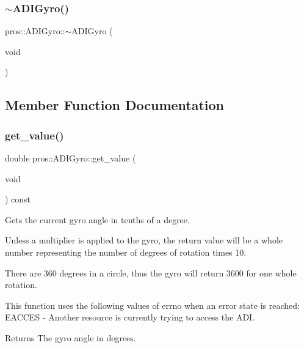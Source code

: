 \subsubsection{\texorpdfstring{$\sim$ADIGyro()}{~ADIGyro()}}
{\footnotesize\ttfamily pros\+::\+A\+D\+I\+Gyro\+::$\sim$\+A\+D\+I\+Gyro (\begin{DoxyParamCaption}\item[{void}]{ }\end{DoxyParamCaption})\hspace{0.3cm}{\ttfamily [override]}}



\subsection{Member Function Documentation}
\mbox{\label{classpros_1_1ADIGyro_a829f933aaaa370483c36aba9f4a4f09c}} 
\subsubsection{\texorpdfstring{get\_value()}{get\_value()}}
{\footnotesize\ttfamily double pros\+::\+A\+D\+I\+Gyro\+::get\+\_\+value (\begin{DoxyParamCaption}\item[{void}]{ }\end{DoxyParamCaption}) const}



Gets the current gyro angle in tenths of a degree. 

Unless a multiplier is applied to the gyro, the return value will be a whole number representing the number of degrees of rotation times 10.

There are 360 degrees in a circle, thus the gyro will return 3600 for one whole rotation.

This function uses the following values of errno when an error state is reached\+: E\+A\+C\+C\+ES -\/ Another resource is currently trying to access the A\+DI.

\begin{DoxyReturn}{Returns}
The gyro angle in degrees. 
\end{DoxyReturn}
\mbox{\label{classpros_1_1ADIGyro_a3e2df8c21f4eb0bfa3559834221195fe}} 
